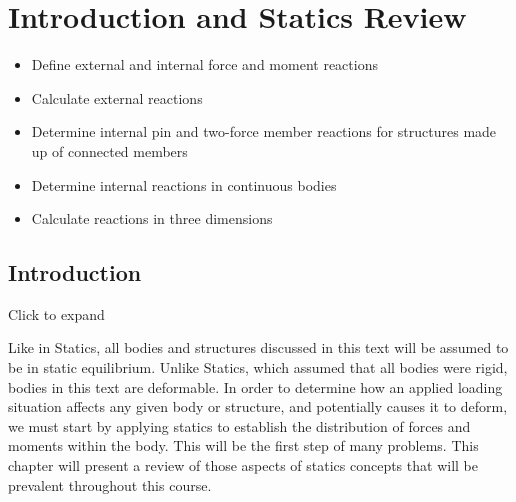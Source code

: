 \documentclass[
  letterpaper,
  DIV=11,
  numbers=noendperiod]{scrreprt}
\providecommand{\tightlist}{%
  \setlength{\itemsep}{0pt}\setlength{\parskip}{0pt}}\usepackage{longtable,booktabs,array}
\begin{document}

\chapter{Introduction and Statics Review}\label{sec-stress}

\begin{tcolorbox}[enhanced jigsaw, colbacktitle=quarto-callout-note-color!10!white, title={Learning Objectives}, coltitle=black, leftrule=.75mm, rightrule=.15mm, opacityback=0, breakable, colframe=quarto-callout-note-color-frame, left=2mm, arc=.35mm, colback=white, bottomrule=.15mm, bottomtitle=1mm, toptitle=1mm, titlerule=0mm, opacitybacktitle=0.6, toprule=.15mm]

\begin{itemize}
\tightlist
\item
  Define external and internal force and moment reactions
\item
  Calculate external reactions
\item
  Determine internal pin and two-force member reactions for structures
  made up of connected members
\item
  Determine internal reactions in continuous bodies
\item
  Calculate reactions in three dimensions
\end{itemize}

\end{tcolorbox}

\section*{Introduction}\label{introduction-1}


Click to expand

Like in Statics, all bodies and structures discussed in this text will
be assumed to be in static equilibrium. Unlike Statics, which assumed
that all bodies were rigid, bodies in this text are deformable. In order
to determine how an applied loading situation affects any given body or
structure, and potentially causes it to deform, we must start by
applying statics to establish the distribution of forces and moments
within the body. This will be the first step of many problems. This
chapter will present a review of those aspects of statics concepts that
will be prevalent throughout this course.
\end{document}
